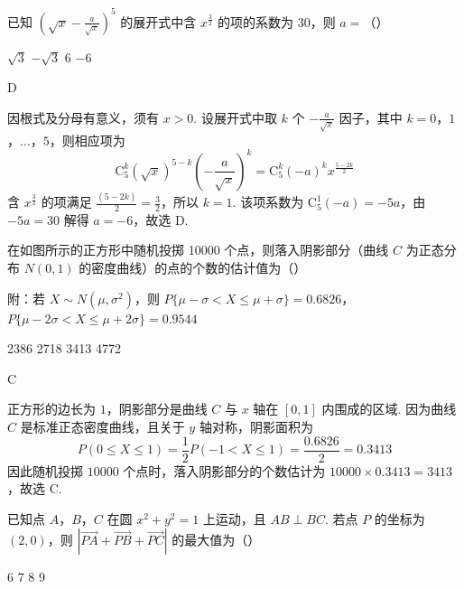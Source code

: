 \begin{problem}
已知 \(\left(\sqrt{x} - \frac{a}{\sqrt{x}}\right)^5\) 的展开式中含 \(x^{\frac{3}{2}}\) 的项的系数为 30，则 \(a =\)（\quad）

\choices
    {\(\sqrt{3}\)}
    {\(-\sqrt{3}\)}
    {6}
    {\(-6\)}
\end{problem}

\begin{answer}
D
\end{answer}

\begin{solution}
因根式及分母有意义，须有 \(x>0\). 设展开式中取 \(k\) 个 \(-\frac{a}{\sqrt{x}}\) 因子，其中 \(k=0\)，\(1\)，\(\ldots\)，\(5\)，则相应项为
\[
\mathrm C_5^k(\sqrt{x})^{5-k}\left(-\frac{a}{\sqrt{x}}\right)^k
=\mathrm C_5^k(-a)^k x^{\frac{5-2k}{2}}
\]
含 \(x^{\frac{3}{2}}\) 的项满足 \(\frac{(5-2k)}{2}=\frac{3}{2}\)，所以 \(k=1\). 该项系数为 \(\mathrm C_5^1(-a)=-5a\)，由 \(-5a=30\) 解得 \(a=-6\)，故选 D.
\end{solution}

\begin{problem}
在如图所示的正方形中随机投掷 10000 个点，则落入阴影部分（曲线 \(C\) 为正态分布 \(N(0,1)\) 的密度曲线）的点的个数的估计值为（\quad）


附：若 \(X \sim N(\mu, \sigma^2)\)，则 \(P\{\mu - \sigma < X \leqslant \mu + \sigma\} = 0.6826\)，\(P\{\mu - 2\sigma < X \leqslant \mu + 2\sigma\} = 0.9544\)

\choices
    {2386}
    {2718}
    {3413}
    {4772}
\end{problem}

\begin{answer}
C
\end{answer}

\begin{solution}
正方形的边长为 \(1\)，阴影部分是曲线 \(C\) 与 \(x\) 轴在 \([0,1]\) 内围成的区域. 因为曲线 \(C\) 是标准正态密度曲线，且关于 \(y\) 轴对称，阴影面积为
\[
P(0\leqslant X\leqslant1)=\frac12P(-1<X\leqslant1)=\frac{0.6826}{2}=0.3413
\]
因此随机投掷 \(10000\) 个点时，落入阴影部分的个数估计为 \(10000\times0.3413=3413\)，故选 C.
\end{solution}

\begin{problem}
已知点 \(A\)，\(B\)，\(C\) 在圆 \(x^{2} + y^{2} = 1\) 上运动，且 \(AB \perp BC\). 若点 \(P\) 的坐标为 \((2,0)\)，则 \(\left|\overrightarrow{PA} + \overrightarrow{PB} + \overrightarrow{PC}\right|\) 的最大值为（\quad）

\choices
    {6}
    {7}
    {8}
    {9}
\end{problem}

